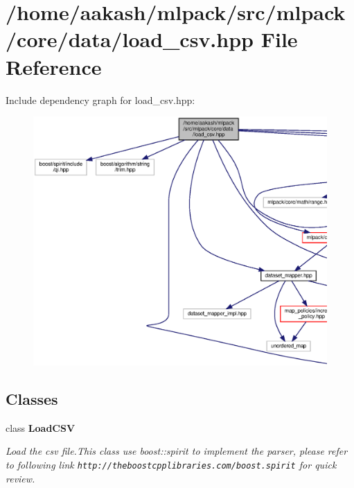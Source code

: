 \section{/home/aakash/mlpack/src/mlpack/core/data/load\+\_\+csv.hpp File Reference}
\label{load__csv_8hpp}
Include dependency graph for load\+\_\+csv.\+hpp\+:
\nopagebreak
\begin{figure}[H]
\begin{center}
\leavevmode
\includegraphics[width=350pt]{load__csv_8hpp__incl}
\end{center}
\end{figure}
\subsection*{Classes}
\begin{DoxyCompactItemize}
\item 
class \textbf{ Load\+C\+SV}
\begin{DoxyCompactList}\small\item\em Load the csv file.\+This class use boost\+::spirit to implement the parser, please refer to following link {\tt http\+://theboostcpplibraries.\+com/boost.\+spirit} for quick review. \end{DoxyCompactList}\end{DoxyCompactItemize}
